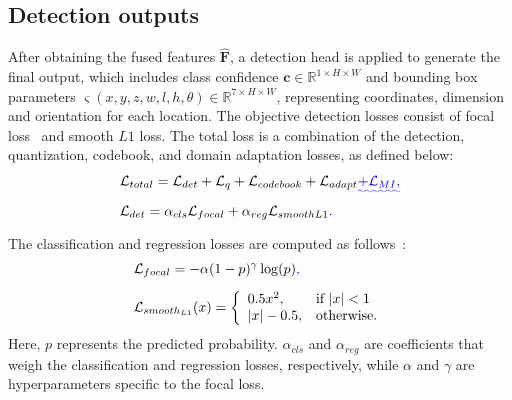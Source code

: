 \documentclass[lettersize,journal]{IEEEtran}
\providecommand{\DIFadd}[1]{{\protect\color{blue}\uwave{#1}}} %
\providecommand{\DIFaddbegin}{} %
\providecommand{\DIFaddend}{} %
\providecommand{\DIFdelbegin}{} %
\providecommand{\DIFdelend}{} %
\newcommand{\DIFscaledelfig}{0.5}
\newlength{\DIFdelgraphicswidth} %
\newlength{\DIFdelgraphicsheight} %
\newcommand{\DIFaddincludegraphics}[2][]{{\color{blue}\fbox{\DIFOincludegraphics[#1]{#2}}}} %
\newcommand{\DIFdelincludegraphics}[2][]{%
\sbox{\DIFdelgraphicsbox}{\DIFOincludegraphics[#1]{#2}}%
\settoboxwidth{\DIFdelgraphicswidth}{\DIFdelgraphicsbox} %
\settoboxtotalheight{\DIFdelgraphicsheight}{\DIFdelgraphicsbox} %
\scalebox{\DIFscaledelfig}{%
\parbox[b]{\DIFdelgraphicswidth}{\usebox{\DIFdelgraphicsbox}\\[-\baselineskip] \rule{\DIFdelgraphicswidth}{0em}}\llap{\resizebox{\DIFdelgraphicswidth}{\DIFdelgraphicsheight}{%
\setlength{\unitlength}{\DIFdelgraphicswidth}%
\begin{picture}(1,1)%
\thicklines\linethickness{2pt} %
{\color[rgb]{1,0,0}\put(0,0){\framebox(1,1){}}}%
{\color[rgb]{1,0,0}\put(0,0){\line( 1,1){1}}}%
{\color[rgb]{1,0,0}\put(0,1){\line(1,-1){1}}}%
\end{picture}%
}\hspace*{3pt}}} %
} %
\DeclareRobustCommand{\DIFaddbegin}{\DIFOaddbegin \let\includegraphics\DIFaddincludegraphics} %
\DeclareRobustCommand{\DIFaddend}{\DIFOaddend \let\includegraphics\DIFOincludegraphics} %
\DeclareRobustCommand{\DIFdelbegin}{\DIFOdelbegin \let\includegraphics\DIFdelincludegraphics} %
\DeclareRobustCommand{\DIFdelend}{\DIFOaddend \let\includegraphics\DIFOincludegraphics} %
\begin{document}
\subsection{Detection outputs}
After obtaining the fused features $\hat{\mathbf{F}}$, a detection head is applied to generate the final output, which includes class confidence $\bm{c} \in \mathbb{R}^{1 \times H \times W}$ and bounding box parameters $\varsigma(x, y, z, w, l, h, \theta)\in\mathbb{R}^{7 \times H \times W}$, representing coordinates, dimension and orientation for each location. 
The objective detection losses consist of focal loss~\cite{linFocalLossDense2018} and smooth $L1$ loss.
The total loss is a combination of the detection, quantization, codebook, and domain adaptation losses, as defined below:
\begin{equation}
  \begin{split}
     & \mathcal{L}_{total} = \mathcal{L}_{det}+\mathcal{L}_{q}+\mathcal{L}_{codebook} +\mathcal{L}_{adapt}\DIFaddbegin \DIFadd{+\mathcal{L}_{MI}, }\DIFaddend \\
     & \mathcal{L}_{det} = \alpha_{cls}\mathcal{L}_{focal} + \alpha_{reg}\mathcal{L}_{smoothL1}\DIFaddbegin \DIFadd{. }\DIFaddend \\
  \end{split}
\end{equation}
The classification and regression losses are computed as follows~\cite{langPointPillarsFastEncoders2019}:
\begin{equation}
  \begin{split}
     & \mathcal{L}_{focal} = -\alpha(1-p)^{\gamma}\log(p)\DIFaddbegin \DIFadd{,  }\DIFaddend \\
     & \mathcal{L}_{smooth_{L1}}(x) = \left\{
    \DIFdelbegin %
\DIFdelend \DIFaddbegin \begin{array}{ll}
      0.5x^2,  & \text{if } |x|<1 \\
      |x|-0.5, & \text{otherwise.}
    \end{array}\DIFaddend 
    \right.
  \end{split}
\end{equation}
Here, $p$ represents the predicted probability. $\alpha_{cls}$ and $\alpha_{reg}$ are coefficients that weigh the classification and regression losses, respectively, while $\alpha$ and $\gamma$ are hyperparameters specific to the focal loss. 
\end{document}
